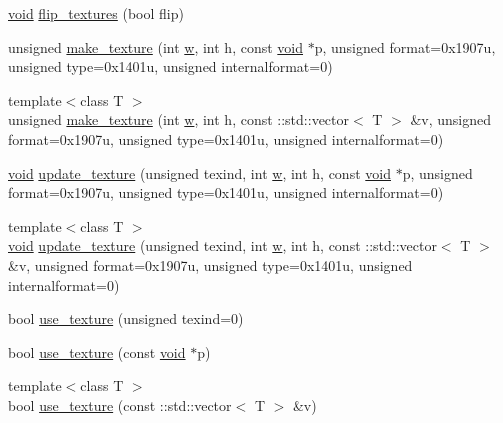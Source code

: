\begin{DoxyCompactItemize}
\hyperlink{namespacetrimesh_a784ddfd979e1c579bda795a8edfc3f43}{void} \hyperlink{classtrimesh_1_1GLManager_ab19ed37d7918772bb60e2acb445da300}{flip\+\_\+textures} (bool flip)
\item 
unsigned \hyperlink{classtrimesh_1_1GLManager_a0130923df1836ce2861a9d52d97d0606}{make\+\_\+texture} (int \hyperlink{namespacetrimesh_acd577db8a2f95fe39ececb95e98a6c71}{w}, int h, const \hyperlink{namespacetrimesh_a784ddfd979e1c579bda795a8edfc3f43}{void} $\ast$p, unsigned format=0x1907u, unsigned type=0x1401u, unsigned internalformat=0)
\item 
{\footnotesize template$<$class T $>$ }\\unsigned \hyperlink{classtrimesh_1_1GLManager_a9afecf2d00750e53992042d8f548b2bb}{make\+\_\+texture} (int \hyperlink{namespacetrimesh_acd577db8a2f95fe39ececb95e98a6c71}{w}, int h, const \+::std\+::vector$<$ T $>$ \&v, unsigned format=0x1907u, unsigned type=0x1401u, unsigned internalformat=0)
\item 
\hyperlink{namespacetrimesh_a784ddfd979e1c579bda795a8edfc3f43}{void} \hyperlink{classtrimesh_1_1GLManager_ae214c8b0b500ad866bedb2655205cb50}{update\+\_\+texture} (unsigned texind, int \hyperlink{namespacetrimesh_acd577db8a2f95fe39ececb95e98a6c71}{w}, int h, const \hyperlink{namespacetrimesh_a784ddfd979e1c579bda795a8edfc3f43}{void} $\ast$p, unsigned format=0x1907u, unsigned type=0x1401u, unsigned internalformat=0)
\item 
{\footnotesize template$<$class T $>$ }\\\hyperlink{namespacetrimesh_a784ddfd979e1c579bda795a8edfc3f43}{void} \hyperlink{classtrimesh_1_1GLManager_a493a6cf77b925629a99303d7bf863179}{update\+\_\+texture} (unsigned texind, int \hyperlink{namespacetrimesh_acd577db8a2f95fe39ececb95e98a6c71}{w}, int h, const \+::std\+::vector$<$ T $>$ \&v, unsigned format=0x1907u, unsigned type=0x1401u, unsigned internalformat=0)
\item 
bool \hyperlink{classtrimesh_1_1GLManager_a9e40257d278f395c4eda64c23795af95}{use\+\_\+texture} (unsigned texind=0)
\item 
bool \hyperlink{classtrimesh_1_1GLManager_a9f9ecdf4e055cf2b86fdfe7a87c543b4}{use\+\_\+texture} (const \hyperlink{namespacetrimesh_a784ddfd979e1c579bda795a8edfc3f43}{void} $\ast$p)
\item 
{\footnotesize template$<$class T $>$ }\\bool \hyperlink{classtrimesh_1_1GLManager_a6169450b9f4bf7c93a3aa038f4e2ceb1}{use\+\_\+texture} (const \+::std\+::vector$<$ T $>$ \&v)
\item 

\end{DoxyCompactItemize}

